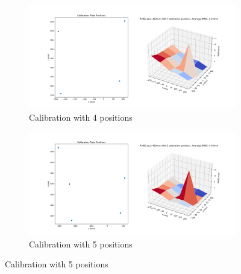 \begin{figure}
    \begin{subfigure}[b]{.45\linewidth}
        \includegraphics[width=\linewidth]{bilder/project/calibration_result_figures/calibration_accuracy_423mm_iter4.png}
        \caption{Calibration with 4 positions}\label{fig:423mm_iter4}
    \end{subfigure}
    \begin{subfigure}[b]{.45\linewidth}
        \includegraphics[width=\linewidth]{bilder/project/calibration_result_figures/calibration_accuracy_423mm_iter5.png}
        \caption{Calibration with 5 positions}\label{fig:423mm_iter5}
    \end{subfigure}



\end{figure}
